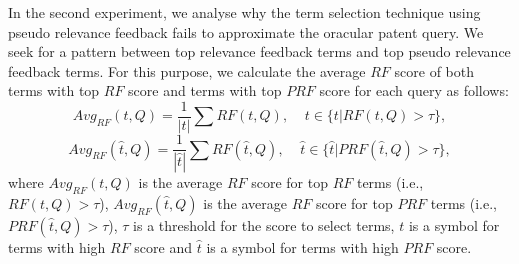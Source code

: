 In the second experiment, we analyse why the term selection technique using pseudo relevance feedback fails to approximate the oracular patent query.  
We seek for a pattern between top relevance feedback terms and top pseudo relevance feedback terms. For this purpose, we calculate the average $\mathit{RF}$ score of both terms with top  $\mathit{RF}$ score and terms with top $\mathit{PRF}$ score for each query as follows:
\begin{equation}
Avg_{RF}(t, Q) = \frac{1}{|t|}\sum {RF}(t, Q), \;\;\;\; t\in \{t | RF(t, Q)>\tau\},
\end{equation}
\begin{equation}
Avg_{RF}(\hat{t}, Q) = \frac{1}{|\hat{t}|}\sum {RF}(\hat{t}, Q), \;\;\;\; \hat{t}\in \{\hat{t} | PRF(\hat{t}, Q)>\tau\},
\end{equation}
where $Avg_{RF}(t, Q)$ is the average  $\mathit{RF}$ score for top  $\mathit{RF}$ terms (i.e., $RF(t, Q)>\tau$), $Avg_{RF}(\hat{t}, Q)$ is the average  $\mathit{RF}$ score for top  $\mathit{PRF}$ terms (i.e., $PRF(\hat{t}, Q)>\tau$), $\tau$ is a threshold for the score to select terms, $t$ is a symbol for terms with high $\mathit{RF}$ score and $\hat{t}$ is a symbol for terms with high $\mathit{PRF}$ score.

